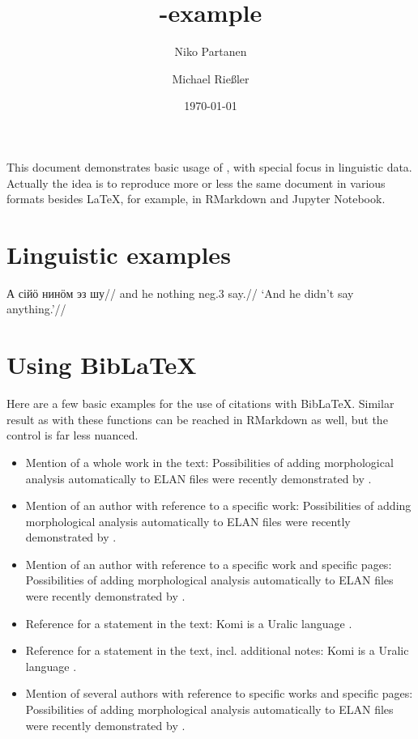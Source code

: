 \documentclass[a4paper, 12pt, english]{article}
\title{\XeLaTeX-example}
\author{
	Niko Partanen
	\and
	Michael Rießler
	}
\date{\today}
\begin{document}
\maketitle 

This document demonstrates basic usage of \XeLaTeX, with special focus in linguistic data. Actually the idea is to reproduce more or less the same document in various formats besides LaTeX, for example, in RMarkdown and Jupyter Notebook.


\section{Linguistic examples}

\ex
\begingl
\gla А сійӧ нинӧм эз шу//
\glb and he nothing neg.3 say.//
\glft ‘And he didn't say anything.’//
\endgl
\xe 

\section{Using BibLaTeX}

Here are a few basic examples for the use of citations with BibLaTeX. Similar result as with these functions can be reached in RMarkdown as well, but the control is far less nuanced.

\begin{itemize}
\item Mention of a whole work in the text:
	\subitem Possibilities of adding morphological analysis automatically to ELAN files were recently demonstrated by \cite{gerstenbergerEtAl2017b}.
\item Mention of an author with reference to a specific work:
	\subitem Possibilities of adding morphological analysis automatically to ELAN files were recently demonstrated by \textcite{gerstenbergerEtAl2017b}.
\item Mention of an author with reference to a specific work and specific pages:
	\subitem Possibilities of adding morphological analysis automatically to ELAN files were recently demonstrated by \textcite[10-11]{gerstenbergerEtAl2017b}.
\item Reference for a statement in the text:
	\subitem Komi is a Uralic language \parencite[2]{gerstenbergerEtAl2017b}.
\item Reference for a statement in the text, incl. additional notes:
	\subitem Komi is a Uralic language \parencite[against the statement made by][4]{gerstenbergerEtAl2017b}.
\item Mention of several authors with reference to specific works and specific pages:
	\subitem Possibilities of adding morphological analysis automatically to ELAN files were recently demonstrated by \textcites[10-11]{gerstenbergerEtAl2017b}[2]{gerstenbergerEtAl2017a}.
\end{itemize}
   
\printbibliography
\end{document}
